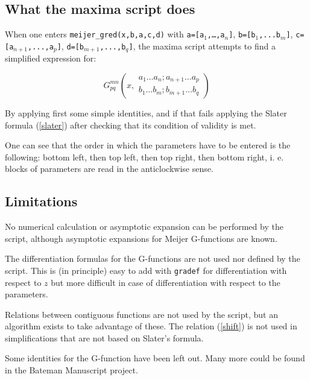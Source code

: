 \documentclass[11pt]{article}
\begin{document}
\subsection{What the maxima script does}

When one enters \texttt{meijer\_gred(x,b,a,c,d)} with \texttt{a=[a$_1$,\ldots,a$_n$]}, \texttt{b=[b$_1$,...b$_m$]}, \texttt{c=[a$_{n+1}$,...,a$_p$]}, \texttt{d=[b$_{m+1}$,...,b$_q$]}, the maxima script attempts to find a simplified expression for:

\begin{equation}
  G^{mn}_{pq}\left(x,\begin{array}{c} a_1\ldots a_n;a_{n+1} \ldots a_p \\ b_1\ldots b_m;b_{m+1} \ldots b_q \end{array} \right)
\end{equation}
 
By applying first some simple identities,\cite{meijer1951,wille1988} and if that fails applying the Slater  formula (\ref{slater}) after checking that its condition of validity is met. 

One can see that the order in which the parameters have to be entered is the following: bottom left, then top left, then top right, then bottom right, i. e. blocks of parameters are read in the anticlockwise sense.


\subsection{Limitations} 

No numerical calculation or asymptotic expansion can be 
 performed by the script, although asymptotic expansions for Meijer G-functions are known.\cite{braaksma1962} 

The differentiation formulas for the G-functions are not used 
nor defined by the script.\cite{roach1997} This is (in principle) 
easy to add with \texttt{gradef} for differentiation with respect to $z$ 
but more difficult in case of differentiation with respect to the parameters. 
 

Relations between contiguous functions are not used by the script, but 
an algorithm exists to take advantage of these.\cite{roach1997}   
The relation (\ref{shift}) is not used in simplifications that are not
based on Slater's formula. 

Some identities for the G-function have been left out.\cite{meijer1932,meijer1935,meijer1939,meijer1951} Many more could be found in the Bateman Manuscript
project.
 
\end{document}
